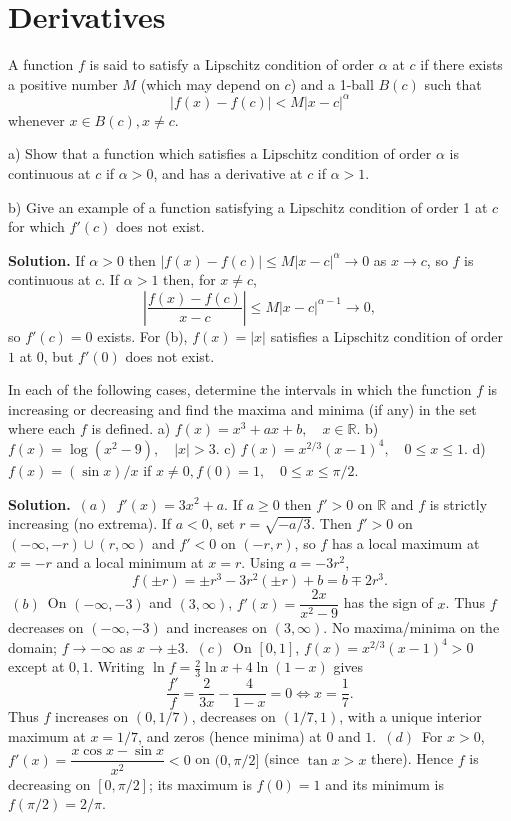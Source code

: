 \chapter{Derivatives}

\begin{problembox}
A function \( f \) is said to satisfy a Lipschitz condition of order \( \alpha \) at \( c \) if there exists a positive number \( M \) (which may depend on \( c \)) and a 1-ball \( B(c) \) such that 
\[ |f(x) - f(c)| < M|x - c|^\alpha \]
whenever \( x \in B(c), x \neq c \).

a) Show that a function which satisfies a Lipschitz condition of order \( \alpha \) is continuous at \( c \) if \( \alpha > 0 \), and has a derivative at \( c \) if \( \alpha > 1 \).

b) Give an example of a function satisfying a Lipschitz condition of order 1 at \( c \) for which \( f'(c) \) does not exist.
\end{problembox}

\noindent\textbf{Solution.}
If $\alpha>0$ then $|f(x)-f(c)|\le M|x-c|^{\alpha}\to 0$ as $x\to c$, so $f$ is continuous at $c$. If $\alpha>1$ then, for $x\ne c$,
\[\left|\frac{f(x)-f(c)}{x-c}\right|\le M|x-c|^{\alpha-1}\to 0,\]
so $f'(c)=0$ exists. For (b), $f(x)=|x|$ satisfies a Lipschitz condition of order $1$ at $0$, but $f'(0)$ does not exist.

\begin{problembox}
In each of the following cases, determine the intervals in which the function \( f \) is increasing or decreasing and find the maxima and minima (if any) in the set where each \( f \) is defined.
a) \( f(x) = x^3 + ax + b, \quad x \in \mathbb{R} \).
b) \( f(x) = \log (x^2 - 9), \quad |x| > 3 \).
c) \( f(x) = x^{2/3}(x - 1)^4, \quad 0 \leq x \leq 1 \).
d) \( f(x) = (\sin x)/x \) if \( x \neq 0, f(0) = 1, \quad 0 \leq x \leq \pi /2 \).
\end{problembox}

\noindent\textbf{Solution.}
\(\,(a)\,\) $f'(x)=3x^2+a$. If $a\ge 0$ then $f'>0$ on $\mathbb{R}$ and $f$ is strictly increasing (no extrema). If $a<0$, set $r=\sqrt{-a/3}$. Then $f'>0$ on $(-\infty,-r)\cup(r,\infty)$ and $f'<0$ on $(-r,r)$, so $f$ has a local maximum at $x=-r$ and a local minimum at $x=r$. Using $a=-3r^2$,
\[f(\pm r)=\pm r^3-3r^2(\pm r)+b=b\mp 2r^3.\]
\(\,(b)\,\) On $(-\infty,-3)$ and $(3,\infty)$, $f'(x)=\dfrac{2x}{x^2-9}$ has the sign of $x$. Thus $f$ decreases on $(-\infty,-3)$ and increases on $(3,\infty)$. No maxima/minima on the domain; $f\to-\infty$ as $x\to\pm3$.\newline
\(\,(c)\,\) On $[0,1]$, $f(x)=x^{2/3}(x-1)^4>0$ except at $0,1$. Writing $\ln f=\tfrac23\ln x+4\ln(1-x)$ gives
\[\frac{f'}{f}=\frac{2}{3x}-\frac{4}{1-x}=0\iff x=\frac17.\]
Thus $f$ increases on $(0,1/7)$, decreases on $(1/7,1)$, with a unique interior maximum at $x=1/7$, and zeros (hence minima) at $0$ and $1$.\newline
\(\,(d)\,\) For $x>0$, $f'(x)=\dfrac{x\cos x-\sin x}{x^2}<0$ on $(0,\pi/2]$ (since $\tan x> x$ there). Hence $f$ is decreasing on $[0,\pi/2]$; its maximum is $f(0)=1$ and its minimum is $f(\pi/2)=2/\pi$.


